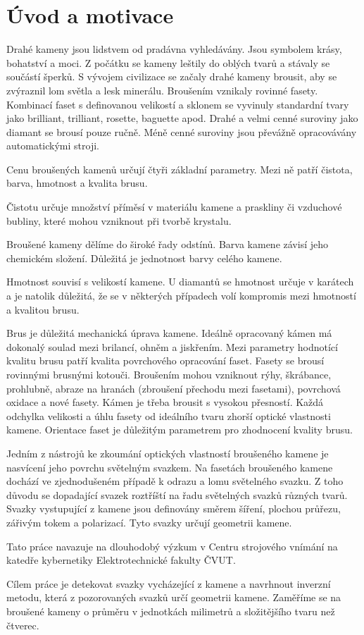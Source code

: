 \part{Úvod a motivace}

Drahé kameny jsou lidstvem od pradávna vyhledávány.
Jsou symbolem krásy, bohatství a moci. Z počátku se kameny leštily do oblých tvarů a stávaly se součástí šperků.
S vývojem civilizace se začaly drahé kameny brousit, aby se zvýraznil lom světla a lesk minerálu. Broušením vznikaly rovinné fasety. Kombinací faset s definovanou velikostí a sklonem se vyvinuly standardní tvary jako brilliant, trilliant, rosette, baguette apod. Drahé a velmi cenné suroviny jako diamant se brousí pouze ručně. Méně cenné suroviny jsou převážně opracovávány automatickými stroji.  

Cenu broušených kamenů určují čtyři základní parametry. Mezi ně patří čistota, barva, hmotnost a kvalita brusu. 

Čistotu určuje množství příměsí v materiálu kamene a praskliny či vzduchové bubliny, které mohou vzniknout při tvorbě krystalu.

Broušené kameny dělíme do široké řady odstínů. Barva kamene závisí jeho chemickém složení. Důležitá je jednotnost barvy celého kamene.

Hmotnost souvisí s velikostí kamene. U diamantů se hmotnost určuje v karátech a je natolik důležitá, že se v některých případech volí kompromis mezi hmotností a kvalitou brusu.

Brus je důležitá mechanická úprava kamene. Ideálně opracovaný kámen má dokonalý soulad mezi brilancí, ohněm a jiskřením. Mezi parametry hodnotící kvalitu brusu patří kvalita povrchového opracování faset. Fasety se brousí rovinnými brusnými kotouči. Broušením mohou vzniknout rýhy, škrábance, prohlubně, abraze na hranách (zbroušení přechodu mezi fasetami), povrchová oxidace a nové fasety. Kámen je třeba brousit s vysokou přesností. Každá odchylka velikosti a úhlu fasety od ideálního tvaru zhorší optické vlastnosti kamene. Orientace faset je důležitým parametrem pro zhodnocení kvality brusu.

Jedním z nástrojů ke zkoumání optických vlastností broušeného kamene je nasvícení jeho povrchu světelným svazkem. Na fasetách broušeného kamene dochází ve zjednodušeném případě k odrazu a lomu světelného svazku. Z toho důvodu se dopadající svazek roztříští na řadu světelných svazků různých tvarů. Svazky vystupující z kamene jsou definovány směrem šíření, plochou průřezu, zářivým tokem a polarizací. Tyto svazky určují geometrii kamene. 

Tato práce navazuje na dlouhodobý výzkum v Centru strojového vnímání na katedře kybernetiky Elektrotechnické fakulty ČVUT. 

Cílem práce je detekovat svazky vycházející z kamene a navrhnout inverzní metodu, která z pozorovaných svazků určí geometrii kamene. Zaměříme se na broušené kameny o průměru v jednotkách milimetrů a složitějšího tvaru než čtverec.  

\clearpage
